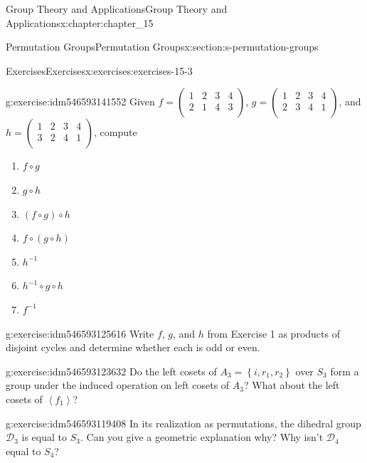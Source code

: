 \documentclass[oneside,10pt,]{book}
\numberwithin{equation}{section}
\begin{document}
\begin{chapterptx}{Group Theory and Applications}{}{Group Theory and Applications}{}{}{x:chapter:chapter_15}
\begin{sectionptx}{Permutation Groups}{}{Permutation Groups}{}{}{x:section:s-permutation-groups}
\begin{exercises-subsection}{Exercises}{}{Exercises}{}{}{x:exercises:exercises-15-3}
\begin{divisionexercise}{1}{}{}{g:exercise:idm546593141552}%
Given \(f=\left(
\begin{array}{cccc}
1 & 2 & 3 & 4 \\
2 & 1 & 4 & 3 \\
\end{array}
\right)\), \(g=\left(
\begin{array}{cccc}
1 & 2 & 3 & 4 \\
2 & 3 & 4 & 1 \\
\end{array}
\right)\), and \(h=\left(
\begin{array}{cccc}
1 & 2 & 3 & 4 \\
3 & 2 & 4 & 1 \\
\end{array}
\right)\), compute%
\begin{multicols}{2}
\begin{enumerate}[label=(\alph*)]
\item{}\(f\circ g\)%
\item{}\(g\circ h\)%
\item{}\((f\circ g)\circ h\)%
\item{}\(f\circ (g\circ h)\)%
\item{}\(h^{-1}\)%
\item{}\(h^{-1} \circ g\circ h\)%
\item{}\(f^{-1}\)%
\end{enumerate}
\end{multicols}
%
\end{divisionexercise}%
\begin{divisionexercise}{2}{}{}{g:exercise:idm546593125616}%
Write \(f\), \(g\), and \(h\) from Exercise 1 as products of disjoint cycles and determine whether each is odd or even.%
\end{divisionexercise}%
\begin{divisionexercise}{3}{}{}{g:exercise:idm546593123632}%
Do the left cosets of \(A_3=\left\{i,r_1,r_2\right\}\) over \(S_3\) form a group under the induced operation on left cosets of \(A_3\)? What about the left cosets of \(\left\langle f_1\right\rangle\)?%
\end{divisionexercise}%
\begin{divisionexercise}{4}{}{}{g:exercise:idm546593119408}%
In its realization as permutations, the dihedral group \(\mathcal{D}_3\) is equal to \(S_3\). Can you give a geometric explanation why?   Why isn't \(\mathcal{D}_4\) equal to \(S_4\)?%
\end{divisionexercise}%

\end{exercises-subsection}
\end{sectionptx}
\end{chapterptx}
\end{document}
